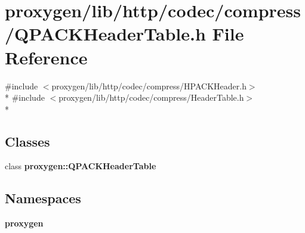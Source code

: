 \section{proxygen/lib/http/codec/compress/\+Q\+P\+A\+C\+K\+Header\+Table.h File Reference}
\label{QPACKHeaderTable_8h}
{\ttfamily \#include $<$proxygen/lib/http/codec/compress/\+H\+P\+A\+C\+K\+Header.\+h$>$}\\*
{\ttfamily \#include $<$proxygen/lib/http/codec/compress/\+Header\+Table.\+h$>$}\\*
\subsection*{Classes}
\begin{DoxyCompactItemize}
\item 
class {\bf proxygen\+::\+Q\+P\+A\+C\+K\+Header\+Table}
\end{DoxyCompactItemize}
\subsection*{Namespaces}
\begin{DoxyCompactItemize}
\item 
 {\bf proxygen}
\end{DoxyCompactItemize}
